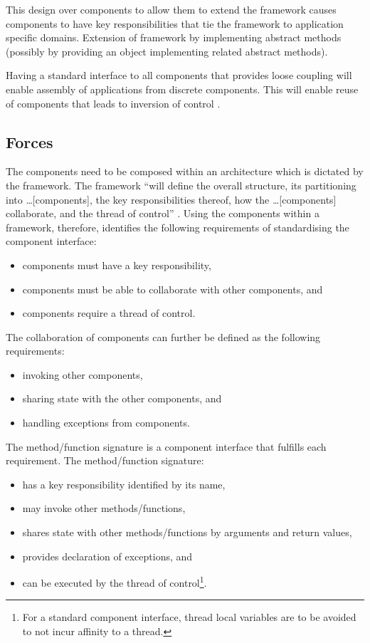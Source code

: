 \documentclass[prodmode]{style/acmlarge}
\begin{document}
This design over components to allow them to extend the framework causes
components to have key responsibilities that tie the framework to application
specific domains.  Extension of framework by implementing abstract methods
(possibly by providing an object implementing related abstract methods).

Having a standard interface to all components that provides loose coupling will
enable assembly of applications from discrete components.  This will enable
reuse of components that leads to inversion of control \cite[p. 27]{gof}.


\subsection{Forces}

The components need to be composed within an architecture which is dictated by
the framework.  The framework ``will define the overall structure, its
partitioning into \ldots [components], the key responsibilities thereof, how the
\ldots [components] collaborate, and the thread of control'' \cite[p.26]{gof}. 
Using the components within a framework, therefore, identifies the following
requirements of standardising the component interface:
\begin{itemize}
  \item components must have a key responsibility,
  \item components must be able to collaborate with other components, and
  \item components require a thread of control.
\end{itemize}

The collaboration of components can further be defined as the following
requirements:
\begin{itemize}
  \item invoking other components,
  \item sharing state with the other components, and
  \item handling exceptions from components.
\end{itemize}

The method/function signature is a component interface that fulfills each
requirement.  The method/function signature:
\begin{itemize}
  \item has a key responsibility identified by its name,
  \item may invoke other methods/functions,
  \item shares state with other methods/functions by arguments and return values,
  \item provides declaration of exceptions, and
  \item can be executed by the thread of control\footnote{For a standard component interface, thread local variables are to be avoided to not incur affinity to a thread.}.
\end{itemize}
\end{document}
